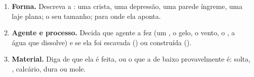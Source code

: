 \begin{method}
\begin{enumerate}
  \item \textbf{Forma.} Descreva a : uma crista, uma
        depressão, uma parede íngreme, uma laje plana; o seu tamanho; para
        onde ela aponta.
  \item \textbf{Agente e processo.} Decida que agente a fez (um , o
        gelo, o vento, o , a água que dissolve) e se ela foi escavada
        () ou construída ().
  \item \textbf{Material.} Diga de que ela é feita, ou o que a  de
        baixo provavelmente é:  solta, , calcário,  dura ou
        mole.
\end{enumerate}
\end{method}

